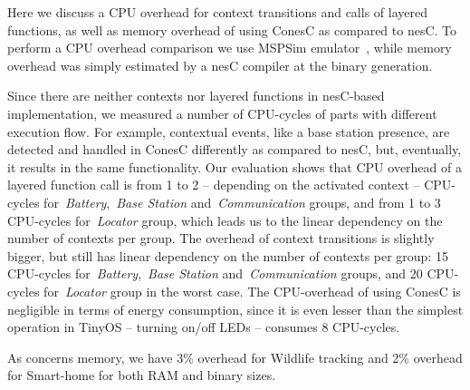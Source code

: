 Here we discuss a CPU overhead for context transitions and calls of layered
functions, as well as memory overhead of using ConesC as compared to nesC. To perform a CPU
overhead comparison we use MSPSim emulator~\cite{eriksson09}, while memory overhead was
simply estimated by a nesC compiler at the binary generation.

Since there are neither contexts nor layered functions in nesC-based
implementation, we measured a number of CPU-cycles of parts with different
execution flow. For example, contextual events, like a base station presence,
are detected and handled in ConesC differently as compared to nesC, but,
eventually, it results in the same functionality. Our evaluation shows that CPU overhead of
a layered function call is from 1 to 2 -- depending on the activated context -- CPU-cycles
for~\emph{Battery},~\emph{Base Station} and~\emph{Communication} groups, and from
1 to 3 CPU-cycles for~\emph{Locator} group, which leads us to the linear dependency on the
number of contexts per group. The overhead of context transitions is slightly bigger, but still has
linear dependency on the number of contexts per group: 15 CPU-cycles
for~\emph{Battery},~\emph{Base Station} and~\emph{Communication} groups, and 20
CPU-cycles for~\emph{Locator} group in the worst case. The CPU-overhead of using ConesC is
negligible in terms of energy consumption, since it is even lesser than the simplest operation in
TinyOS -- turning on/off LEDs -- consumes 8 CPU-cycles.

As concerns memory, we have 3\% overhead for Wildlife tracking and 2\% overhead
for Smart-home for both RAM and binary sizes.
